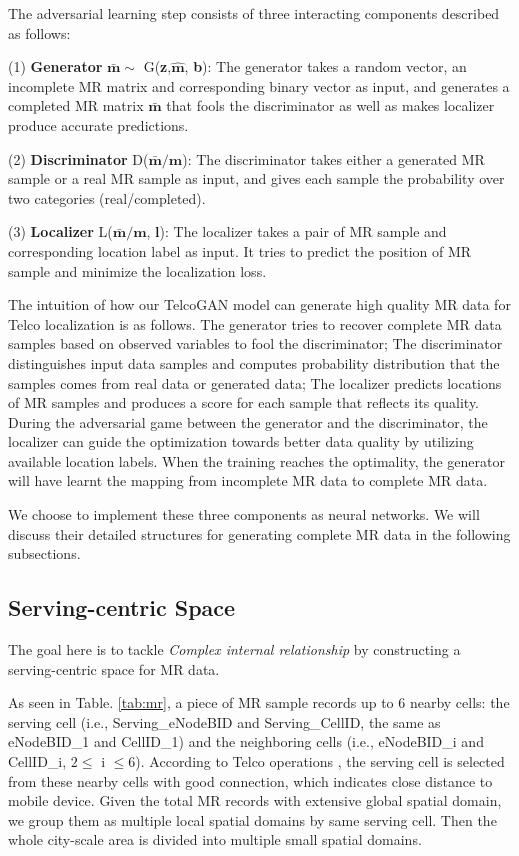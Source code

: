 The adversarial learning step consists of three interacting components described as follows:

(1) \textbf{Generator} $\bar{\textbf{m}}\sim$ G(\textbf{z},$\hat{\textbf{m}}$, \textbf{b}): The generator takes a random vector, an incomplete MR matrix and corresponding binary vector as input, and generates a completed MR matrix $\bar{\textbf{m}}$ that fools the discriminator as well as makes localizer produce accurate predictions.

(2) \textbf{Discriminator} D($\bar{\textbf{m}}/\textbf{m}$): The discriminator takes either a generated MR sample or a real MR sample as input, and gives each sample the probability over two categories (real/completed).

(3) \textbf{Localizer} L($\bar{\textbf{m}}/\textbf{m}$, $\textbf{l}$): The localizer takes a pair of MR sample and corresponding location label as input. It tries to predict the position of MR sample and minimize the localization loss.

The intuition of how our TelcoGAN model can generate high quality MR data for Telco localization is as follows. The generator tries to recover complete MR data samples based on observed variables to fool the discriminator; The discriminator distinguishes input data samples and computes probability distribution that the samples comes from real data or generated data; The localizer predicts locations of MR samples and produces a score for each sample that reflects its quality. During the adversarial game between the generator and the discriminator, the localizer can guide the optimization towards better data quality by utilizing available location labels. When the training reaches the optimality, the generator will have learnt the mapping from incomplete MR data to complete MR data.

We choose to implement these three components as neural networks. We will discuss their detailed structures for generating complete MR data in the following subsections.


\subsection{Serving-centric Space}
The goal here is to tackle \emph{Complex internal relationship} by constructing a serving-centric space for MR data.

As seen in Table. \ref{tab:mr}, a piece of MR sample records up to 6 nearby cells: the serving cell (i.e., Serving\_eNodeBID and Serving\_CellID, the same as eNodeBID\_1 and CellID\_1) and the neighboring cells (i.e., eNodeBID\_i and CellID\_i, $2\leq$ i $\leq 6$). According to Telco operations \cite{DBLP:conf/infocom/RayDM16}, the serving cell is selected from these nearby cells with good connection, which indicates close distance to mobile device. Given the total MR records with extensive global spatial domain, we group them as multiple local spatial domains by same serving cell. Then the whole city-scale area is divided into multiple small spatial domains.

